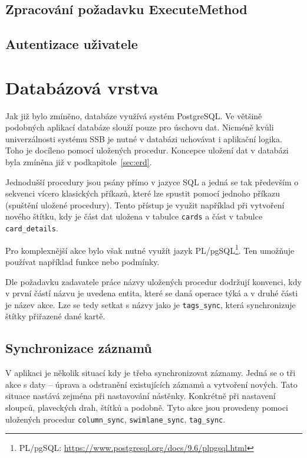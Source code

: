 \subsection{Zpracování požadavku ExecuteMethod}
\blindtext


\subsection{Autentizace uživatele}
\blindtext



\section{Databázová vrstva}
Jak již bylo zmíněno, databáze využívá systém PostgreSQL. Ve většině podobných aplikací databáze slouží pouze pro úschovu dat. Nicméně kvůli univerzálnosti systému SSB je nutné v databázi uchovávat i aplikační logika. Toho je docíleno pomocí uložených procedur. Koncepce uložení dat v databázi byla zmíněna již v podkapitole~\ref{sec:erd}.

Jednodušší procedury jsou psány přímo v jazyce SQL a jedná se tak především o sekvenci vícero klasických příkazů, které lze spustit pomocí jednoho příkazu (spuštění uložené procedury). Tento přístup je využit například při vytvoření nového štítku, kdy je část dat uložena v tabulce \texttt{cards} a část v tabulce \texttt{card\_details}.

Pro komplexnější akce bylo však nutné využít jazyk PL/pgSQL\footnote{PL/pgSQL: \url{https://www.postgresql.org/docs/9.6/plpgsql.html}}. Ten umožňuje používat například funkce nebo podmínky.

Dle požadavku zadavatele práce názvy uložených procedur dodržují konvenci, kdy v první částí názvu je uvedena entita, které se daná operace týká a v druhé části je název akce. Lze se tedy setkat s názvy jako je \texttt{tags\_sync}, která synchronizuje štítky přiřazené dané kartě. 


\subsection{Synchronizace záznamů}
V aplikaci je několik situací kdy je třeba synchronizovat záznamy. Jedná se o tři akce s daty -- úprava a odstranění existujících záznamů a vytvoření nových. Tato situace nastává zejména při nastavování nástěnky. Konkrétně při nastavení sloupců, plaveckých drah, štítků a podobně. Tyto akce jsou provedeny pomoci uložených procedur \texttt{column\_sync}, \texttt{swimlane\_sync}, \texttt{tag\_sync}.

